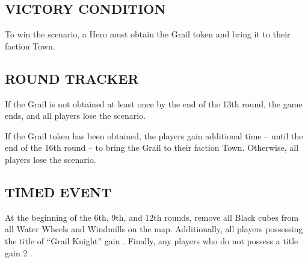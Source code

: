 \begin{multicols*}{2}
\subsection*{\MakeUppercase{Victory Condition}}
To win the scenario, a Hero must obtain the Grail token and bring it to their faction Town.

\subsection*{\MakeUppercase{Round Tracker}}
If the Grail is not obtained at least once by the end of the 13th round, the game ends, and all players lose the scenario.

If the Grail token has been obtained, the players gain additional time – until the end of the 16th round – to bring the Grail to their faction Town. Otherwise, all players lose the scenario.

\subsection*{\MakeUppercase{Timed Event}}
At the beginning of the 6th, 9th, and 12th rounds, remove all Black cubes from all Water Wheels and Windmills on the map. Additionally, all players possessing the title of ``\textcolor{darkcerulean}{Grail Knight}'' gain . Finally, any players who do not possess a title gain 2 .
\end{multicols*}

